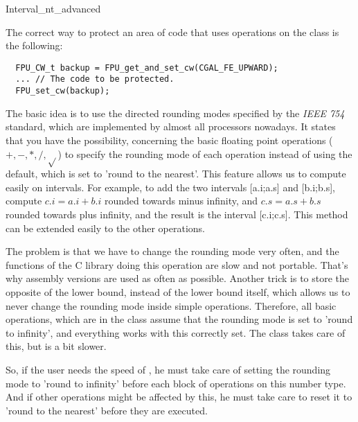 \begin{ccAdvanced}
\begin{ccClass} {Interval_nt_advanced}
\ccExample

The correct way to protect an area of code that uses operations on the class
 is the following:

\begin{verbatim}
  FPU_CW_t backup = FPU_get_and_set_cw(CGAL_FE_UPWARD);
  ... // The code to be protected.
  FPU_set_cw(backup);
\end{verbatim}

\ccImplementation

The basic idea is to use the directed rounding modes specified by the 
{\it IEEE 754} standard, which are implemented by almost all processors 
nowadays.
It states that you have the possibility, concerning the basic floating point
operations ($+,-,*,/,\sqrt{}$) to specify the rounding mode of each operation
instead of using the default, which is set to 'round to the nearest'.
This feature allows us to compute easily on intervals.  For example, to
add the two intervals [a.i;a.s] and [b.i;b.s], compute $c.i=a.i+b.i$ rounded
towards minus infinity, and $c.s=a.s+b.s$ rounded towards plus infinity, and
the result is the interval [c.i;c.s].  This method can be extended easily to
the other operations.

The problem is that we have to change the rounding mode very often, and the
functions of the C library doing this operation are slow and not portable.
That's why assembly versions are used as often as possible.
Another trick is to store the opposite of the lower bound, instead of the
lower bound itself, which allows us to never change the rounding mode inside
simple operations.  Therefore, all basic operations, which are in the class 
 assume that the rounding mode is set to 
'round to infinity', and everything works with this correctly set.  
The class  takes care of this, but is a bit slower.

So, if the user needs the speed of , he must
take care of setting the rounding mode to 'round to infinity' before each
block of operations on this number type.  And if other operations might be
affected by this, he must take care to reset it to 'round to the nearest'
before they are executed.



\end{ccClass}
\end{ccAdvanced}
